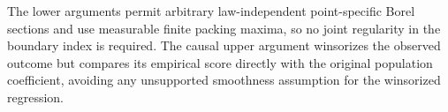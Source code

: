 The lower arguments permit arbitrary law-independent point-specific Borel sections and use measurable finite packing maxima, so no joint regularity in the boundary index is required.  The causal upper argument winsorizes the observed outcome but compares its empirical score directly with the original population coefficient, avoiding any unsupported smoothness assumption for the winsorized regression.